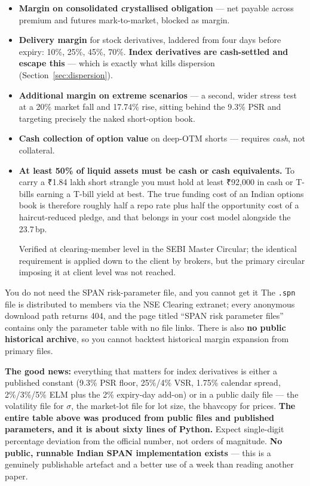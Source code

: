 \documentclass[11pt,a4paper]{article}
\newcommand{\rs}{₹}
\newcommand{\srcnote}[1]{{\footnotesize\color{soft}#1\par}}
\begin{document}
\begin{itemize}
\item \textbf{Margin on consolidated crystallised obligation} --- net payable
across premium and futures mark-to-market, blocked as margin.
\item \textbf{Delivery margin} for stock derivatives, laddered from four days
before expiry: 10\%, 25\%, 45\%, 70\%. \textbf{Index derivatives are cash-settled
and escape this} --- which is exactly what kills dispersion (Section~\ref{sec:dispersion}).
\item \textbf{Additional margin on extreme scenarios} --- a second, wider stress
test at a 20\% market fall and 17.74\% rise, sitting behind the 9.3\% PSR and
targeting precisely the naked short-option book.
\item \textbf{Cash collection of option value} on deep-OTM shorts --- requires
\emph{cash}, not collateral.
\item \textbf{At least 50\% of liquid assets must be cash or cash equivalents.} To
carry a \rs 1.84 lakh short strangle you must hold at least \rs 92{,}000 in cash
or T-bills earning a T-bill yield at best. The true funding cost of an Indian
options book is therefore roughly half a repo rate plus half the opportunity cost
of a haircut-reduced pledge, and that belongs in your cost model alongside the
23.7\,bp. \srcnote{Verified at clearing-member level in the SEBI Master Circular;
the identical requirement is applied down to the client by brokers, but the
primary circular imposing it at client level was not reached.}
\end{itemize}

\begin{keyfact}{You do not need the SPAN risk-parameter file, and you cannot get it}
The \texttt{.spn} file is distributed to members via the NSE Clearing extranet;
every anonymous download path returns 404, and the page titled ``SPAN risk
parameter files'' contains only the parameter table with no file links. There is
also \textbf{no public historical archive}, so you cannot backtest historical
margin expansion from primary files.

\textbf{The good news:} everything that matters for index derivatives is either a
published constant (9.3\% PSR floor, 25\%/4\% VSR, 1.75\% calendar spread,
2\%/3\%/5\% ELM plus the 2\% expiry-day add-on) or in a public daily file --- the
volatility file for $\sigma$, the market-lot file for lot size, the bhavcopy for
prices. \textbf{The entire table above was produced from public files and
published parameters, and it is about sixty lines of Python.} Expect single-digit
percentage deviation from the official number, not orders of magnitude. \textbf{No
public, runnable Indian SPAN implementation exists} --- this is a genuinely
publishable artefact and a better use of a week than reading another paper.
\end{keyfact}
\end{document}
